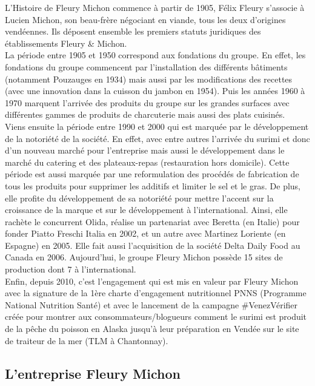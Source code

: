 \documentclass[a4paper,12pt]{extarticle}
\begin{document}
	L’Histoire de Fleury Michon commence à partir de 1905, Félix Fleury s'associe à Lucien Michon, son beau-frère négociant en viande, tous les deux d’origines vendéennes. Ils déposent ensemble les premiers statuts juridiques des établissements Fleury \& Michon.\\
    La période entre 1905 et 1950 correspond aux fondations du groupe. En effet, les fondations du groupe commencent par l’installation des différents bâtiments (notamment Pouzauges en 1934) mais aussi par les modifications des recettes (avec une innovation dans la cuisson du jambon en 1954).
Puis les années 1960 à 1970 marquent l’arrivée des produits du groupe sur les grandes surfaces avec différentes gammes de produits de charcuterie mais aussi des plats cuisinés.\\
	Viens ensuite la période entre 1990 et 2000 qui est marquée par le développement de la notoriété de la société. En effet, avec entre autres l’arrivée du surimi et donc d’un nouveau marché pour l’entreprise mais aussi le développement dans le marché du catering et des plateaux-repas (restauration hors domicile). Cette période est aussi marquée par une reformulation des procédés de fabrication de tous les produits pour supprimer les additifs et limiter le sel et le gras. De plus, elle profite du développement de sa notoriété pour mettre l’accent sur la croissance de la marque et sur le développement à l'international. Ainsi, elle rachète le concurrent Olida, réalise un partenariat avec Beretta (en Italie) pour fonder Piatto Freschi Italia en 2002, et un autre avec Martinez Loriente (en Espagne) en 2005. Elle fait aussi l'acquisition de la société Delta Daily Food au Canada en 2006. Aujourd’hui, le groupe Fleury Michon possède 15 sites de production dont 7 à l'international.\\
    Enfin, depuis 2010, c’est l’engagement qui est mis en valeur par Fleury Michon avec la signature de la 1ère charte d’engagement nutritionnel PNNS (Programme National Nutrition Santé) et avec le lancement de la campagne \#VenezVérifier créée pour montrer aux consommateurs/blogueurs comment le surimi est produit de la pêche du poisson en Alaska jusqu'à leur préparation en Vendée sur le site de traiteur de la mer (TLM à Chantonnay).\\

	\clearpage

	\subsection{L’entreprise Fleury Michon}
\end{document}
